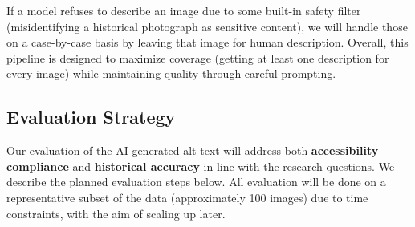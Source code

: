 \documentclass{anthology-ch}         %
\begin{document}
If a model refuses to describe an image due to some built-in safety filter (misidentifying a historical photograph as sensitive content), we will handle those on a case-by-case basis by leaving that image for human description. Overall, this pipeline is designed to maximize coverage (getting at least one description for every image) while maintaining quality through careful prompting.

\subsection{Evaluation Strategy}

Our evaluation of the AI-generated alt-text will address both \textbf{accessibility compliance} and \textbf{historical accuracy} in line with the research questions. We describe the planned evaluation steps below. All evaluation will be done on a representative subset of the data (approximately 100 images) due to time constraints, with the aim of scaling up later.
\end{document}
